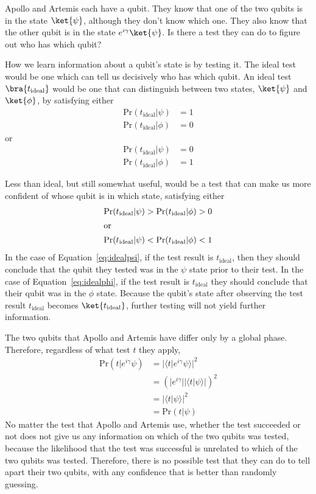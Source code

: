 \documentclass{article}
\theoremstyle{definition}
\newcommand{\abs}[1]{{\big\vert} #1 {\big\vert}}
\begin{document}
\begin{example}
	\label{ex:globalphase}
	Apollo and Artemis each have a qubit.  They know that one of the two qubits is in the state $\ket{\psi}$, although they don't know which one.  They also know that the other qubit is in the state $e^{i \gamma} \ket{\psi}$.  Is there a test they can do to figure out who has which qubit?

	\textnormal{How we learn information about a qubit's state is by testing it.  The ideal test would be one which can tell us decisively who has which qubit.  An ideal test $\bra{t_\text{ideal}}$ would be one that can distinguish between two states, $\ket{\psi}$ and $\ket{\phi}$, by satisfying either}
	\begin{align}
		\text{Pr}(t_\text{ideal} | \psi) &= 1\\
		\text{Pr}(t_\text{ideal} | \phi) &= 0
	\end{align}
	\textnormal{or}
	\begin{align}
		\text{Pr}(t_\text{ideal} | \psi) &= 0\\
		\text{Pr}(t_\text{ideal} | \phi) &= 1
	\end{align}

	\textnormal{Less than ideal, but still somewhat useful, would be a test that can make us more confident of whose qubit is in which state, satisfying either}
	\begin{align}
		\text{Pr}(t_\text{ideal} | \psi) &> \text{Pr}(t_\text{ideal} | \phi)\label{eq:idealpsi} > 0\\
		\intertext{\textnormal{or}}
		\text{Pr}(t_\text{ideal} | \psi) &< \text{Pr}(t_\text{ideal} | \phi)\label{eq:idealphi} < 1
	\end{align}
	\textnormal{In the case of Equation~\ref{eq:idealpsi}, if the test result is $t_\text{ideal}$, then they should conclude that the qubit they tested was in the $\psi$ state prior to their test.  In the case of Equation~\ref{eq:idealphi}, if the test result is $t_\text{ideal}$ they should conclude that their qubit was in the $\phi$ state.  Because the qubit's state after observing the test result $t_\text{ideal}$ becomes $\ket{t_\text{ideal}}$, further testing will not yield further information.}

	\textnormal{The two qubits that Apollo and Artemis have differ only by a global phase.  Therefore, regardless of what test $t$ they apply,}
	\begin{align}
		\text{Pr}(t | e^{i \gamma} \psi) &= \abs{\langle t | e^{i \gamma} \psi \rangle}^2\\
		&= \left(\abs{e^{i \gamma}}\abs{\langle t | \psi \rangle}\right)^2\\
		&= \abs{\langle t | \psi \rangle}^2\\
		&= \text{Pr}( t | \psi)
	\end{align}
	\textnormal{No matter the test that Apollo and Artemis use, whether the test succeeded or not does not give us any information on which of the two qubits was tested, because the likelihood that the test was successful is unrelated to which of the two qubits was tested.  Therefore, there is no possible test that they can do to tell apart their two qubits, with any confidence that is better than randomly guessing.}
\end{example}
\end{document}
